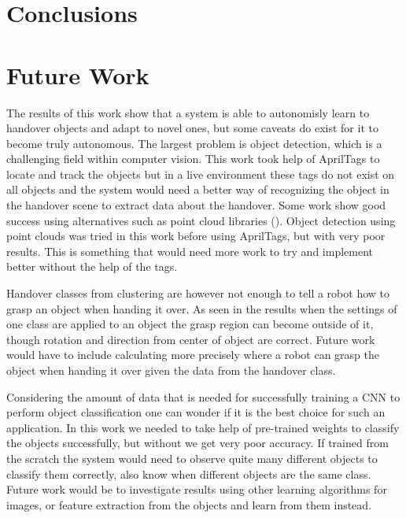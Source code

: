 \section{Conclusions}


\section{Future Work}

The results of this work show that a system is able to autonomisly learn to handover objects and adapt to novel ones, but some caveats do exist for it to become truly autonomous. The largest problem is object detection, which is a challenging field within computer vision. This work took help of AprilTags to locate and track the objects but in a live environment these tags do not exist on all objects and the system would need a better way of recognizing the object in the handover scene to extract data about the handover. Some work show good success using alternatives such as point cloud libraries (\parencite{Chan2015a}). Object detection using point clouds was tried in this work before using AprilTags, but with very poor results. This is something that would need more work to try and implement better without the help of the tags.

Handover classes from clustering are however not enough to tell a robot how to grasp an object when handing it over. As seen in the results when the settings of one class are applied to an object the grasp region can become outside of it, though rotation and direction from center of object are correct. Future work would have to include calculating more precisely where a robot can grasp the object when handing it over given the data from the handover class.

Considering the amount of data that is needed for successfully training a CNN to perform object classification one can wonder if it is the best choice for such an application. In this work we needed to take help of pre-trained weights to classify the objects successfully, but without we get very poor accuracy. If trained from the scratch the system would need to observe quite many different objects to classify them correctly, also know when different objects are the same class. Future work would be to investigate results using other learning algorithms for images, or feature extraction from the objects and learn from them instead.

